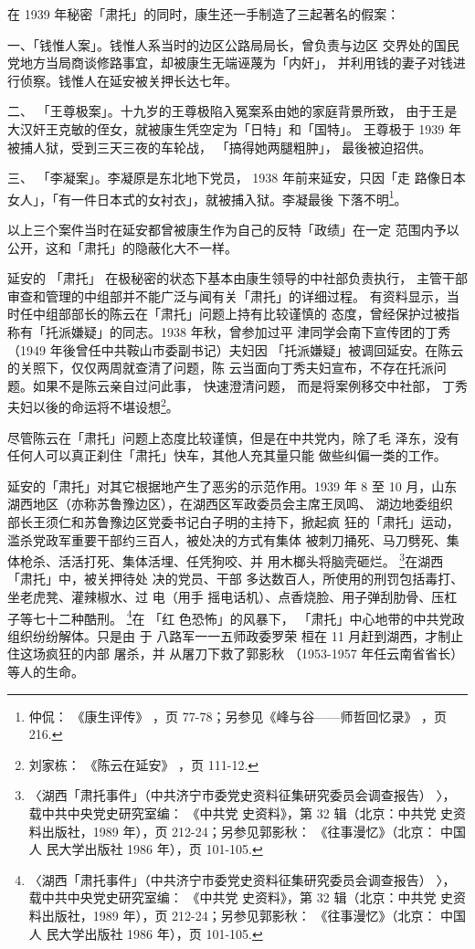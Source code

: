 在 1939 年秘密「肃托」的同时，康生还一手制造了三起著名的假案：

一、「钱惟人案」。钱惟人系当时的边区公路局局长，曾负责与边区
交界处的国民党地方当局商谈修路事宜，却被康生无端诬蔑为「内奸」，
并利用钱的妻子对钱进行侦察。钱惟人在延安被关押长达七年。

二、
「王尊极案」。十九岁的王尊极陷入冤案系由她的家庭背景所致，
由于王是大汉奸王克敏的侄女，就被康生凭空定为「日特」和「国特」。
王尊极于 1939 年被捕人狱，受到三天三夜的车轮战，
「搞得她两腿粗肿」，
最後被迫招供。

三、
「李凝案」。李凝原是东北地下党员， 1938 年前来延安，只因「走
路像日本女人」，「有一件日本式的女衬衣」，就被捕入狱。李凝最後
下落不明\footnote{仲侃：
《康生评传》
，页 77-78；另参见《峰与谷——师哲回忆录》
，页 216.}。

以上三个案件当时在延安都曾被康生作为自己的反特「政绩」在一定
范围内予以公开，这和「肃托」的隐蔽化大不一样。

延安的
「肃托」
在极秘密的状态下基本由康生领导的中社部负责执行，
主管干部审查和管理的中组部并不能广泛与闻有关「肃托」的详细过程。
有资料显示，当时任中组部部长的陈云在「肃托」问题上持有比较谨慎的
态度，曾经保护过被指称有「托派嫌疑」的同志。1938 年秋，曾参加过平
津同学会南下宣传团的丁秀（1949 年後曾任中共鞍山市委副书记）夫妇因
「托派嫌疑」被调回延安。在陈云的关照下，仅仅两周就查清了问题，陈
云当面向丁秀夫妇宣布，不存在托派问题。如果不是陈云亲自过问此事，
快速澄清问题，
而是将案例移交中社部，
丁秀夫妇以後的命运将不堪设想\footnote{刘家栋：
《陈云在延安》
，页 111-12.}。

尽管陈云在「肃托」问题上态度比较谨慎，但是在中共党内，除了毛
泽东，没有任何人可以真正刹住「肃托」快车，其他人充其量只能
做些纠偏一类的工作。

延安的「肃托」对其它根据地产生了恶劣的示范作用。1939 年 8 至 10 月，山东
湖西地区（亦称苏鲁豫边区），在湖西区军政委员会主席王凤鸣、 湖边地委组织
部长王须仁和苏鲁豫边区党委书记白子明的主持下，掀起疯 狂的「肃托」运动，
滥杀党政军重要干部约三百人，被处决的方式有集体 被刺刀捅死、马刀劈死、集
体枪杀、活活打死、集体活埋、任凭狗咬、并 用木榔头将脑壳砸烂。
\footnote{〈湖西「肃托事件」（中共济宁市委党史资料征集研究委员会调查报告）
〉，载中共中央党史研究室编： 《中共党 史资料》，第 32 辑（北京：中共党
史资料出版社，1989 年），页 212-24；另参见郭影秋： 《往事漫忆》（北京：
中国人 民大学出版社 1986 年），页 101-105.}在湖西「肃托」中，被关押待处
决的党员、干部 多达数百人，所使用的刑罚包括毒打、坐老虎凳、灌辣椒水、过
电（用手 摇电话机）、点香烧脸、用子弹刮肋骨、压杠子等七十二种酷刑。
\footnote{〈湖西「肃托事件」（中共济宁市委党史资料征集研究委员会调查报告）
〉，载中共中央党史研究室编： 《中共党 史资料》，第 32 辑（北京：中共党
史资料出版社，1989 年），页 212-24；另参见郭影秋： 《往事漫忆》（北京：
中国人 民大学出版社 1986 年），页 101-105.}在 「红 色恐怖」的风暴下，
「肃托」中心地带的中共党政组织纷纷解体。只是由 于 八路军一一五师政委罗荣
桓在 11 月赶到湖西，才制止住这场疯狂的内部 屠杀，并 从屠刀下救了郭影秋
（1953-1957 年任云南省省长）等人的生命。

